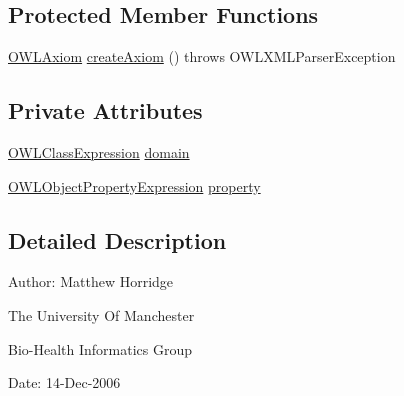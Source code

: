 \subsection*{Protected Member Functions}
\begin{DoxyCompactItemize}
\item 
\hyperlink{interfaceorg_1_1semanticweb_1_1owlapi_1_1model_1_1_o_w_l_axiom}{O\-W\-L\-Axiom} \hyperlink{classorg_1_1coode_1_1owlapi_1_1owlxmlparser_1_1_o_w_l_object_property_domain_element_handler_a10f80a0abf6abbe8feb7c9486c5612a6}{create\-Axiom} ()  throws O\-W\-L\-X\-M\-L\-Parser\-Exception 
\end{DoxyCompactItemize}
\subsection*{Private Attributes}
\begin{DoxyCompactItemize}
\item 
\hyperlink{interfaceorg_1_1semanticweb_1_1owlapi_1_1model_1_1_o_w_l_class_expression}{O\-W\-L\-Class\-Expression} \hyperlink{classorg_1_1coode_1_1owlapi_1_1owlxmlparser_1_1_o_w_l_object_property_domain_element_handler_a28459fa7df6f3126d5666ee4f2756dd3}{domain}
\item 
\hyperlink{interfaceorg_1_1semanticweb_1_1owlapi_1_1model_1_1_o_w_l_object_property_expression}{O\-W\-L\-Object\-Property\-Expression} \hyperlink{classorg_1_1coode_1_1owlapi_1_1owlxmlparser_1_1_o_w_l_object_property_domain_element_handler_a63cd23fe25bf4daf7a12b248def37536}{property}
\end{DoxyCompactItemize}


\subsection{Detailed Description}
Author\-: Matthew Horridge\par
 The University Of Manchester\par
 Bio-\/\-Health Informatics Group\par
 Date\-: 14-\/\-Dec-\/2006\par
\par
 


